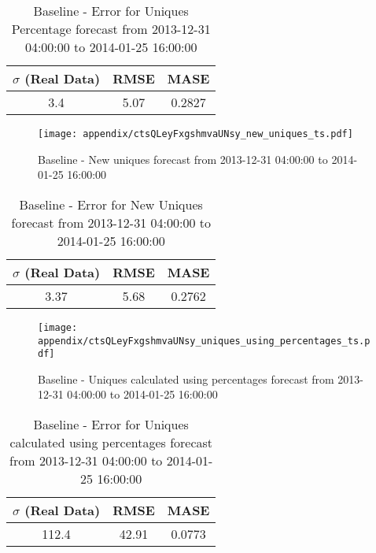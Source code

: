 \begin{table}[H]
\centering
\footnotesize
\begin{tabular}{ccc}
$\sigma$ (Real Data) & RMSE & MASE   \\ \hline
3.4 & 5.07 & 0.2827 \\
\end{tabular}

\vspace{0.5cm}

\caption[]{
Baseline - Error for Uniques Percentage forecast from 2013-12-31 04:00:00 to 2014-01-25 16:00:00}
\end{table}

\begin{figure}[H] \begin{center} \leavevmode
\texttt{[image: appendix/ctsQLeyFxgshmvaUNsy\_new\_uniques\_ts.pdf]} \caption[]{
Baseline - New uniques forecast from 2013-12-31 04:00:00 to 2014-01-25 16:00:00} \label{fig:appendix/ctsQLeyFxgshmvaUNsy_new_uniques_ts.pdf} \end{center}
\end{figure}

\begin{table}[H]
\centering
\footnotesize
\begin{tabular}{ccc}
$\sigma$ (Real Data) & RMSE & MASE   \\ \hline
3.37 & 5.68 & 0.2762 \\
\end{tabular}

\vspace{0.5cm}

\caption[]{
Baseline - Error for New Uniques forecast from 2013-12-31 04:00:00 to 2014-01-25 16:00:00}
\end{table}

\begin{figure}[H] \begin{center} \leavevmode
\texttt{[image: appendix/ctsQLeyFxgshmvaUNsy\_uniques\_using\_percentages\_ts.pdf]} \caption[]{
Baseline - Uniques calculated using percentages forecast from 2013-12-31 04:00:00 to 2014-01-25 16:00:00} \label{fig:appendix/ctsQLeyFxgshmvaUNsy_uniques_using_percentages_ts.pdf} \end{center}
\end{figure}

\begin{table}[H]
\centering
\footnotesize
\begin{tabular}{ccc}
$\sigma$ (Real Data) & RMSE & MASE   \\ \hline
112.4 & 42.91 & 0.0773 \\
\end{tabular}

\vspace{0.5cm}

\caption[]{
Baseline - Error for Uniques calculated using percentages forecast from 2013-12-31 04:00:00 to 2014-01-25 16:00:00}
\end{table}

